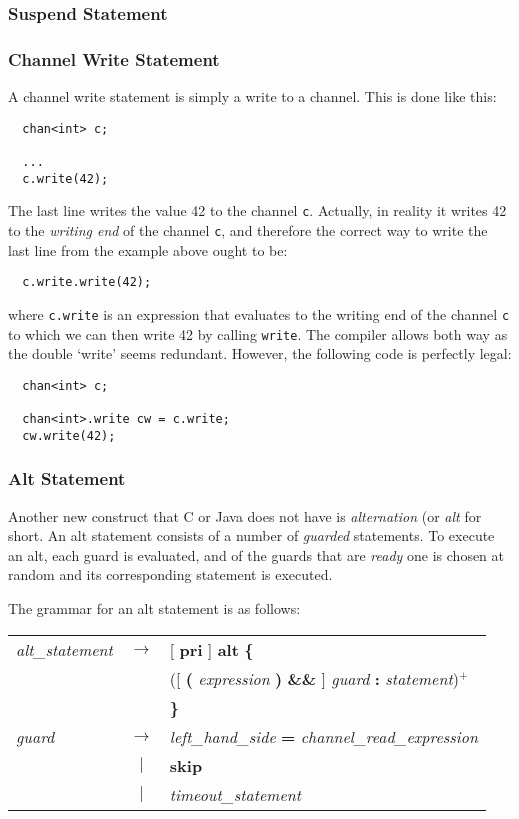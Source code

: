\documentclass[pdflatex,11pt,letter]{article}
\begin{document}
\subsubsection{Suspend Statement}
\subsubsection{Channel Write Statement}

A channel write statement is simply a write to a channel. This is done like this:
\begin{verbatim}
  chan<int> c;
  
  ...
  c.write(42);
\end{verbatim}
The last line writes the value 42 to the channel {\tt c}. Actually, in reality it writes 42 to the {\em writing end} of the channel {\tt c}, and therefore the correct way to write the last line from the example above ought to be:
\begin{verbatim}
  c.write.write(42);
\end{verbatim}
where {\tt c.write} is an expression that evaluates to the writing end of the channel {\tt c} to which we can then write 42 by calling {\tt write}. The compiler allows both way as the double `write' seems redundant. However, the following code is perfectly legal:
\begin{verbatim}
  chan<int> c;
  
  chan<int>.write cw = c.write;
  cw.write(42);
\end{verbatim}


\subsubsection{Alt Statement}
\label{sec:altStatement}

Another new construct that C or Java does not have is {\it alternation} (or {\it alt} for short. An alt statement consists of a number of {\it guarded} statements. To execute an alt, each guard is evaluated, and of the guards that are {\it ready} one is chosen at random and its corresponding statement is executed.

The grammar for an alt statement is as follows:

\begin{center}
	\begin{tabular}{lcl}
		{\it alt\_statement} & $\rightarrow$ & [ {\bf pri} ] {\bf alt} {\bf \{}\\
		                     && \quad  ([ {\bf (} {\it expression} {\bf )} {\bf \&\&} ] {\it guard} {\bf :} {\it statement})$^+$\\
		                     && {\bf \}}\\
		{\it guard} & $\rightarrow$ & {\it left\_hand\_side} {\bf = } {\it channel\_read\_expression}\\
		& $\mid$ & {\bf skip}\\
	    & $\mid$ & {\it timeout\_statement}\\            
	\end{tabular}
\end{center}
\end{document}
